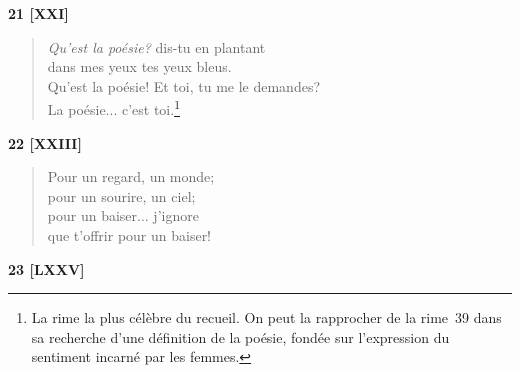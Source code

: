 \smallskip

\begin{center}
  \textbf{21 [XXI]}
\end{center}

\begin{verse}
  \emph{Qu'est la poésie?} dis-tu en plantant \\
  dans mes yeux tes yeux bleus. \\
  Qu'est la poésie! Et toi, tu me le demandes? \\
  La poésie... c'est toi.\footnote{La rime la plus célèbre du
  recueil. On peut la rapprocher de la rime~39 dans sa recherche d'une
  définition de la poésie, fondée sur l'expression du sentiment
  incarné par les femmes.}
\end{verse}

\smallskip

\begin{center}
  \textbf{22 [XXIII]}
\end{center}

\begin{verse}
  Pour un regard, un monde; \\
  pour un sourire, un ciel; \\
  pour un baiser... j'ignore \\
  que t'offrir pour un baiser!
\end{verse}

\bigskip

\begin{center}
  \textbf{23 [LXXV]}
\end{center}

